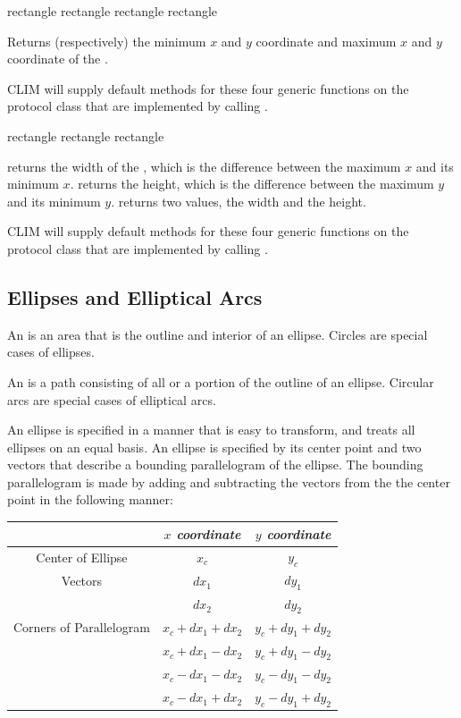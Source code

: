 {rectangle}
 {rectangle}
 {rectangle}
 {rectangle}

Returns (respectively) the minimum $x$ and $y$ coordinate and maximum $x$ and
$y$ coordinate of the  .

CLIM will supply default methods for these four generic functions on the
protocol class  that are implemented by calling
.


  {rectangle}
 {rectangle}
   {rectangle}

 returns the width of the  ,
which is the difference between the maximum $x$ and its minimum $x$.
 returns the height, which is the difference between the
maximum $y$ and its minimum $y$.   returns two values, the
width and the height.

CLIM will supply default methods for these four generic functions on the
protocol class  that are implemented by calling
.


\subsection {Ellipses and Elliptical Arcs}

An  is an area that is the outline and interior of an ellipse.
Circles are special cases of ellipses.

An  is a path consisting of all or a portion of the
outline of an ellipse.  Circular arcs are special cases of elliptical arcs.

An ellipse is specified in a manner that is easy to transform, and treats all
ellipses on an equal basis.  An ellipse is specified by its center point and two
vectors that describe a bounding parallelogram of the ellipse.  The bounding
parallelogram is made by adding and subtracting the vectors from the the center
point in the following manner:

\begin{tabular}{|c|cc|}
 \hline
   & {\sl $x$ coordinate} & {\sl $y$ coordinate} \\
 \hline
 Center of Ellipse & $x_c$ & $y_c$ \\
 \hline
 Vectors & $dx_1$ & $dy_1$ \\
         & $dx_2$ & $dy_2$ \\
 \hline
 Corners of Parallelogram & $x_c + dx_1 + dx_2$ & $y_c + dy_1 + dy_2$ \\
                          & $x_c + dx_1 - dx_2$ & $y_c + dy_1 - dy_2$ \\
                          & $x_c - dx_1 - dx_2$ & $y_c - dy_1 - dy_2$ \\
                          & $x_c - dx_1 + dx_2$ & $y_c - dy_1 + dy_2$ \\
 \hline
\end{tabular}

